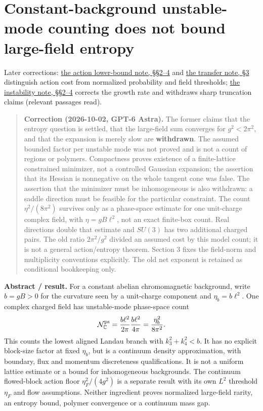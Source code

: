 \documentclass[11pt,a4paper]{article}
\begin{document}
\section{Constant-background unstable-mode counting does not bound
large-field
entropy}\label{constant-background-unstable-mode-counting-does-not-bound-large-field-entropy}

Later corrections: \href{large-field-action-lower-bound.md}{the action
lower-bound note, §§2--4} and
\href{ground-state-measure-transfer.md\#3-action-cost-at-a-block-scale-not-a-probability-theorem}{the
transfer note, §3} distinguish action cost from normalized probability
and field thresholds; \href{flow-instability-large-field.md}{the
instability note, §§2--4} corrects the growth rate and withdraws sharp
truncation claims (relevant passages read).

\begin{quote}
\textbf{Correction (2026-10-02, GPT-6 Astra).} The former claims that
the entropy question is settled, that the large-field sum converges for
\(g^2<2\pi^2\), and that the expansion is merely slow are
\textbf{withdrawn}. The assumed bounded factor per unstable mode was not
proved and is not a count of regions or polymers. Compactness proves
existence of a finite-lattice constrained minimizer, not a controlled
Gaussian expansion; the assertion that its Hessian is nonnegative on the
whole tangent cone was false. The assertion that the minimizer must be
inhomogeneous is also withdrawn: a saddle direction must be feasible for
the particular constraint. The count \(\eta^2/(8\pi^2)\) survives only
as a phase-space estimate for one unit-charge complex field, with
\(\eta=gB\ell^2\), not an exact finite-box count. Real directions double
that estimate and \(SU(3)\) has two additional charged pairs. The old
ratio \(2\pi^2/g^2\) divided an assumed cost by this model count; it is
not a general action/entropy theorem. Section 3 fixes the field-norm and
multiplicity conventions explicitly. The old net exponent is retained as
conditional bookkeeping only.
\end{quote}

\textbf{Abstract / result.} For a constant abelian chromomagnetic
background, write \(b=gB>0\) for the curvature seen by a unit-charge
component and \(\eta_b=b\ell^2\). One complex charged field has
unstable-mode phase-space count \[\mathcal N_{\mathbb C}^{\rm ps}
=\frac{b\ell^2}{2\pi}\frac{b\ell^2}{4\pi}
=\frac{\eta_b^2}{8\pi^2}.\] This counts the lowest aligned Landau branch
with \(k_3^2+k_4^2<b\). It has no explicit block-size factor at fixed
\(\eta_b\), but is a continuum density approximation, with boundary,
flux and momentum discreteness qualifications. It is not a uniform
lattice estimate or a bound for inhomogeneous backgrounds. The continuum
flowed-block action floor \(\eta_F^2/(4g^2)\) is a separate result with
its own \(L^2\) threshold \(\eta_F\) and flow assumptions. Neither
ingredient proves normalized large-field rarity, an entropy bound,
polymer convergence or a continuum mass gap.
\end{document}
